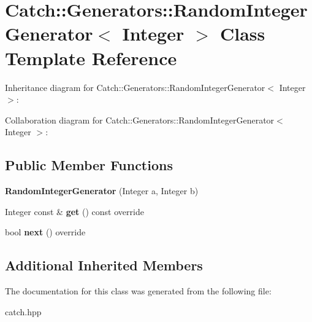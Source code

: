 \hypertarget{classCatch_1_1Generators_1_1RandomIntegerGenerator}{}\section{Catch\+:\+:Generators\+:\+:Random\+Integer\+Generator$<$ Integer $>$ Class Template Reference}
\label{classCatch_1_1Generators_1_1RandomIntegerGenerator}


Inheritance diagram for Catch\+:\+:Generators\+:\+:Random\+Integer\+Generator$<$ Integer $>$\+:


Collaboration diagram for Catch\+:\+:Generators\+:\+:Random\+Integer\+Generator$<$ Integer $>$\+:
\subsection*{Public Member Functions}
\begin{DoxyCompactItemize}
\item 
\mbox{\label{classCatch_1_1Generators_1_1RandomIntegerGenerator_a886d16c899ad70781b83a0e8f9d2cf96}} 
{\bfseries Random\+Integer\+Generator} (Integer a, Integer b)
\item 
\mbox{\label{classCatch_1_1Generators_1_1RandomIntegerGenerator_aafbdf9028762f5e8f8ca9c317d686fca}} 
Integer const  \& {\bfseries get} () const override
\item 
\mbox{\label{classCatch_1_1Generators_1_1RandomIntegerGenerator_aaa3db70fbdfa3e8dcb61fb5592eba81f}} 
bool {\bfseries next} () override
\end{DoxyCompactItemize}
\subsection*{Additional Inherited Members}


The documentation for this class was generated from the following file\+:\begin{DoxyCompactItemize}
\item 
catch.\+hpp\end{DoxyCompactItemize}
